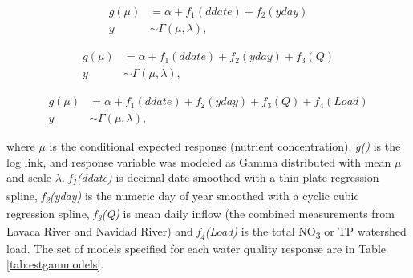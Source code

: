 \documentclass[water,article,submit,oneauthor]{Definitions/mdpi}
\begin{document}
\begin{equation}\label{eq:5}
\begin{aligned}
g(\mu) &= \alpha + f_1(ddate) + f_2(yday) \\
y &\sim \Gamma(\mu,\lambda),
\end{aligned}
\end{equation}

\begin{equation}\label{eq:6}
\begin{aligned}
g(\mu) &= \alpha + f_1(ddate) + f_2(yday) + f_3(Q) \\
y &\sim \Gamma(\mu,\lambda),
\end{aligned}
\end{equation}

\begin{equation}\label{eq:7}
\begin{aligned}
g(\mu) &= \alpha + f_1(ddate) + f_2(yday) + f_3(Q) + f_4(Load) \\
y &\sim \Gamma(\mu,\lambda),
\end{aligned}
\end{equation}

where \(\mu\) is the conditional expected response (nutrient
concentration), \emph{g()} is the log link, and response variable was
modeled as Gamma distributed with mean \(\mu\) and scale \(\lambda\).
\emph{f\textsubscript{1}(ddate)} is decimal date smoothed with a
thin-plate regression spline, \emph{f\textsubscript{2}(yday)} is the
numeric day of year smoothed with a cyclic cubic regression spline,
\emph{f\textsubscript{3}(Q)} is mean daily inflow (the combined
measurements from Lavaca River and Navidad River) and
\emph{f\textsubscript{4}(Load)} is the total NO\textsubscript{3} or TP
watershed load. The set of models specified for each water quality
response are in Table \ref{tab:estgammodels}.
\end{document}
